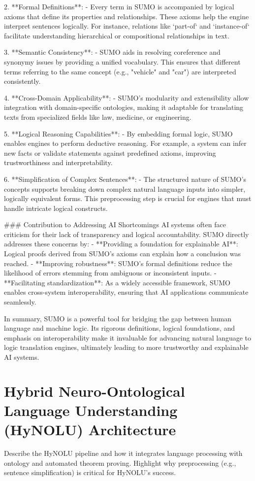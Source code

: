 2. **Formal Definitions**:
   - Every term in SUMO is accompanied by logical axioms that define its properties and relationships. These axioms help the engine interpret sentences logically. For instance, relations like `part-of` and `instance-of` facilitate understanding hierarchical or compositional relationships in text.

3. **Semantic Consistency**:
   - SUMO aids in resolving coreference and synonymy issues by providing a unified vocabulary. This ensures that different terms referring to the same concept (e.g., "vehicle" and "car") are interpreted consistently.

4. **Cross-Domain Applicability**:
   - SUMO’s modularity and extensibility allow integration with domain-specific ontologies, making it adaptable for translating texts from specialized fields like law, medicine, or engineering.

5. **Logical Reasoning Capabilities**:
   - By embedding formal logic, SUMO enables engines to perform deductive reasoning. For example, a system can infer new facts or validate statements against predefined axioms, improving trustworthiness and interpretability.

6. **Simplification of Complex Sentences**:
   - The structured nature of SUMO’s concepts supports breaking down complex natural language inputs into simpler, logically equivalent forms. This preprocessing step is crucial for engines that must handle intricate logical constructs.

### Contribution to Addressing AI Shortcomings
AI systems often face criticism for their lack of transparency and logical accountability. SUMO directly addresses these concerns by:
- **Providing a foundation for explainable AI**: Logical proofs derived from SUMO’s axioms can explain how a conclusion was reached.
- **Improving robustness**: SUMO’s formal definitions reduce the likelihood of errors stemming from ambiguous or inconsistent inputs.
- **Facilitating standardization**: As a widely accessible framework, SUMO enables cross-system interoperability, ensuring that AI applications communicate seamlessly.

In summary, SUMO is a powerful tool for bridging the gap between human language and machine logic. Its rigorous definitions, logical foundations, and emphasis on interoperability make it invaluable for advancing natural language to logic translation engines, ultimately leading to more trustworthy and explainable AI systems.
\section{Hybrid Neuro-Ontological Language Understanding (HyNOLU) Architecture}
Describe the HyNOLU pipeline and how it integrates language processing with ontology and automated theorem proving. Highlight why preprocessing (e.g., sentence simplification) is critical for HyNOLU's success.

